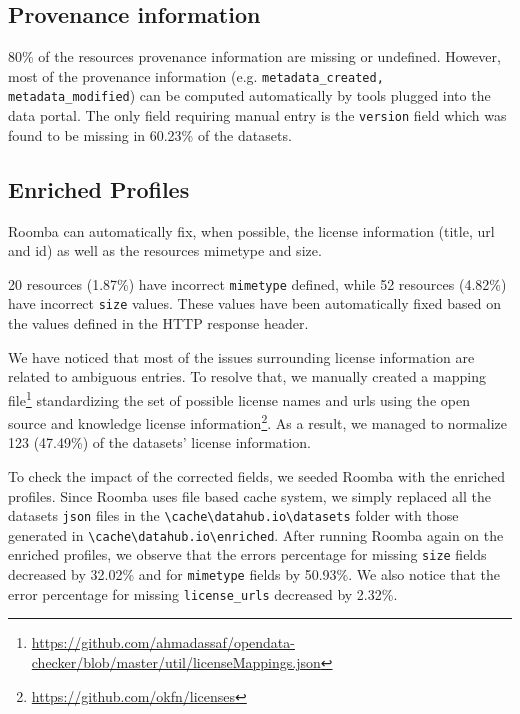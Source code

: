 \documentclass[runningheads,a4paper]{llncs}
\begin{document}
\subsection{Provenance information}
80\% of the resources provenance information are missing or undefined. However, most of the provenance information (e.g. \texttt{metadata\_created, metadata\_modified}) can be computed automatically by tools plugged into the data portal. The only field requiring manual entry is the \texttt{version} field which was found to be missing in 60.23\% of the datasets.

\subsection{Enriched Profiles}
Roomba can automatically fix, when possible, the license information (title, url and id) as well as the resources mimetype and size.

20 resources (1.87\%) have incorrect \texttt{mimetype} defined, while 52 resources (4.82\%) have incorrect \texttt{size} values. These values have been automatically fixed based on the values defined in the HTTP response header.

We have noticed that most of the issues surrounding license information are related to ambiguous entries. To resolve that, we manually created a mapping file\footnote{\url{https://github.com/ahmadassaf/opendata-checker/blob/master/util/licenseMappings.json}} standardizing the set of possible license names and urls using the open source and knowledge license information\footnote{\url{https://github.com/okfn/licenses}}. As a result, we managed to normalize 123 (47.49\%) of the datasets' license information.

To check the impact of the corrected fields, we seeded Roomba with the enriched profiles. Since Roomba uses file based cache system, we simply replaced all the datasets \texttt{json} files in the \texttt{\textbackslash cache\textbackslash datahub.io\textbackslash datasets} folder with those generated in \texttt{\textbackslash cache\textbackslash datahub.io\textbackslash enriched}. After running Roomba again on the enriched profiles, we observe that the errors percentage for missing \texttt{size} fields decreased by 32.02\% and for \texttt{mimetype} fields by 50.93\%. We also notice that the error percentage for missing \texttt{license\_urls} decreased by 2.32\%.

\end{document}
